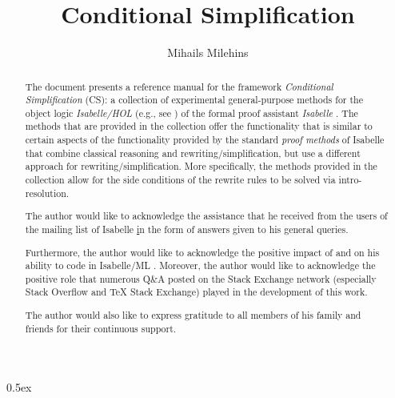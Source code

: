 \documentclass[11pt,a4paper]{article}
\begin{document}
\sloppy

\title{Conditional Simplification} 
\author{Mihails Milehins}
\maketitle

\newpage

\begin{abstract}
The document presents a reference manual for the 
framework \textit{Conditional Simplification} (CS): 
a collection of experimental general-purpose methods for the object logic
\textit{Isabelle/HOL} (e.g., see \cite{yang_comprehending_2017}) 
of the formal proof assistant \textit{Isabelle}
\cite{paulson_natural_1986}.
The methods that are provided in the collection offer the functionality 
that is similar to certain aspects of the functionality provided by the 
standard \textit{proof methods} \cite{wenzel_isabelle/isar_2019-1} 
of Isabelle that combine classical reasoning 
and rewriting/simplification, but use a different approach for 
rewriting/simplification. More specifically, the methods provided in the
collection allow for the side conditions of
the rewrite rules to be solved via intro-resolution.
\end{abstract}

\newpage

\renewcommand{\abstractname}{Acknowledgements}
\begin{abstract}

The author would like to acknowledge the assistance that he received from 
the users of the mailing list of Isabelle 
\href{https://lists.cam.ac.uk/mailman/listinfo/cl-isabelle-users}
in the form of answers given to his general queries. 

Furthermore, the author would like to acknowledge the positive 
impact of \cite{urban_isabelle_2019} and 
\cite{wenzel_isabelle/isar_2019} on his ability to code in 
Isabelle/ML \cite{milner_definition_1997, wenzel_isabelle/isar_2019}.
Moreover, the author would like to acknowledge
the positive role that numerous Q\&A posted on the Stack Exchange network 
(especially Stack Overflow and TeX Stack Exchange) played in the 
development of this work. 

The author would also like to express gratitude to all members of his family 
and friends for their continuous support.

\end{abstract}

\newpage

\tableofcontents

\newpage

\parindent 0pt\parskip 0.5ex



\newpage


\end{document}
